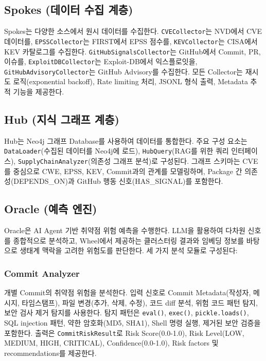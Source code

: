 ﻿\documentclass[conference]{IEEEtran}
\begin{document}
\subsection{Spokes (데이터 수집 계층)}

Spokes는 다양한 소스에서 원시 데이터를 수집한다. \texttt{CVECollector}는 NVD에서 CVE 데이터를, \texttt{EPSSCollector}는 FIRST에서 EPSS 점수를, \texttt{KEVCollector}는 CISA에서 KEV 카탈로그를 수집한다. \texttt{GitHubSignalsCollector}는 GitHub에서 Commit, PR, 이슈를, \texttt{ExploitDBCollector}는 Exploit-DB에서 익스플로잇을, \texttt{GitHubAdvisoryCollector}는 GitHub Advisory를 수집한다. 모든 Collector는 재시도 로직(exponential backoff), Rate limiting 처리, JSONL 형식 출력, Metadata 추적 기능을 제공한다.

\subsection{Hub (지식 그래프 계층)}

Hub는 Neo4j 그래프 Database를 사용하여 데이터를 통합한다. 주요 구성 요소는 \texttt{DataLoader}(수집된 데이터를 Neo4j에 로드), \texttt{HubQuery}(RAG를 위한 쿼리 인터페이스), \texttt{SupplyChainAnalyzer}(의존성 그래프 분석)로 구성된다. 그래프 스키마는 CVE를 중심으로 CWE, EPSS, KEV, Commit과의 관계를 모델링하며, Package 간 의존성(DEPENDS\_ON)과 GitHub 행동 신호(HAS\_SIGNAL)를 포함한다.

\subsection{Oracle (예측 엔진)}

Oracle은 AI Agent 기반 취약점 위험 예측을 수행한다. LLM을 활용하여 다차원 신호를 종합적으로 분석하고, Wheel에서 제공하는 클러스터링 결과와 임베딩 정보를 바탕으로 생태계 맥락을 고려한 위험도를 판단한다. 세 가지 분석 모듈로 구성된다:

\subsubsection{Commit Analyzer}

개별 Commit의 취약점 위험을 분석한다. 입력 신호로 Commit Metadata(작성자, 메시지, 타임스탬프), 파일 변경(추가, 삭제, 수정), 코드 diff 분석, 위험 코드 패턴 탐지, 보안 검사 제거 탐지를 사용한다. 탐지 패턴은 \texttt{eval()}, \texttt{exec()}, \texttt{pickle.loads()}, SQL injection 패턴, 약한 암호화(MD5, SHA1), Shell 명령 실행, 제거된 보안 검증을 포함한다. 출력은 \texttt{CommitRiskResult}로 Risk Score(0.0-1.0), Risk Level(LOW, MEDIUM, HIGH, CRITICAL), Confidence(0.0-1.0), Risk factors 및 recommendations를 제공한다.
\end{document}
